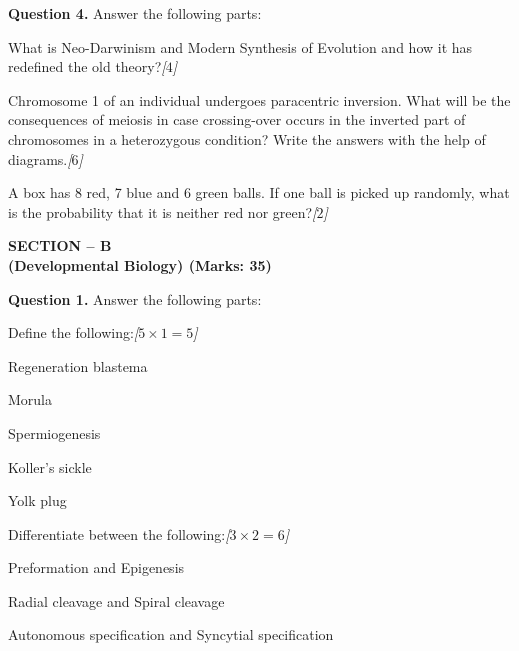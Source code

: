 \documentclass[11pt,a4paper]{article}
\newcommand{\pts}[1]{\hfill   \textit{[#1]}}
\begin{document}
\medskip


\noindent   \textbf{Question 4.} Answer the following parts:

\begin{parts}
  \item What is Neo-Darwinism and Modern Synthesis of Evolution and how it has redefined the old theory?\pts{$4$}
  \item Chromosome 1 of an individual undergoes paracentric inversion. What will be the consequences of meiosis in case crossing-over occurs in the inverted part of chromosomes in a heterozygous condition? Write the answers with the help of diagrams.\pts{$6$}
  \item A box has 8 red, 7 blue and 6 green balls. If one ball is picked up randomly, what is the probability that it is neither red nor green?\pts{$2$}
\end{parts}

\pagebreak

\begin{center}
   \textbf{SECTION -- B} \\
   \textbf{(Developmental Biology) (Marks: 35)}
\end{center}

\medskip


\noindent   \textbf{Question 1.} Answer the following parts:

\begin{parts}
  \item Define the following:\pts{$5  \times 1 = 5$}
  
\begin{parts}
    \item Regeneration blastema
    \item Morula
    \item Spermiogenesis
    \item Koller's sickle
    \item Yolk plug
  \end{parts}

  \item Differentiate between the following:\pts{$3  \times 2 = 6$}
  
\begin{parts}
    \item Preformation and Epigenesis
    \item Radial cleavage and Spiral cleavage
    \item Autonomous specification and Syncytial specification
  \end{parts}
\end{parts}
\end{document}
